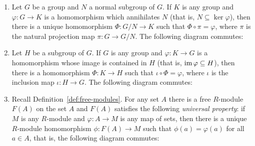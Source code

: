     \begin{example}\label{example:universal-properties}
        \phantom{a}
        \begin{enumerate}[label = (\arabic*)]
            \item Let $G$ be a group and $N$ a normal subgroup of $G$. If $K$ is any group and $\varphi:G \rightarrow K$ is a homomorphism which annihilates $N$ (that is, $N \subseteq \ker{\varphi}$), then there is a unique homomorphism $\Phi:G/N \rightarrow K$ such that $\Phi \circ \pi = \varphi$, where $\pi$ is the natural projection map $\pi: G \rightarrow G/N$. The following diagram commutes:
                    \begin{center}
                    \end{center}
            
            \item Let $H$ be a subgroup of $G$. If $G$ is any group and $\varphi: K \rightarrow G$ is a homomorphism whose image is contained in $H$ (that is, $\operatorname{im}{\varphi} \subseteq H$), then there is a homomorphism $\Phi:K \rightarrow H$ such that $\iota \circ \Phi = \varphi$, where $\iota$ is the inclusion map $\iota : H \rightarrow G$. The following diagram commutes:
                        \begin{center}
                        \end{center}
            
            \item Recall Definition~\ref{def:free-modules}. For any set $A$ there is a free $R$-module $F(A)$ on the set $A$ and $F(A)$ satisfies the following \textit{universal property}: if $M$ is any $R$-module and $\varphi:A \rightarrow M$ is any map of sets, then there is a unique $R$-module homomorphism $\phi:F(A) \rightarrow M$ such that $\phi(a) = \varphi(a)$ for all $a \in A$, that is, the following diagram commutes:
            \begin{center}
            \end{center}
            

\end{enumerate}
\end{example}
